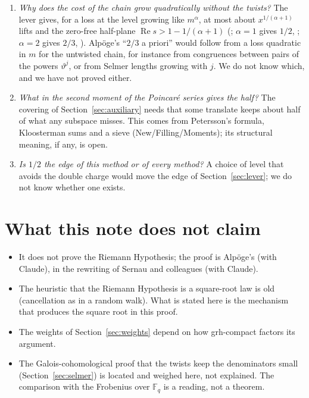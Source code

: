 \documentclass[11pt]{article}
\theoremstyle{definition}
\theoremstyle{remark}
\begin{document}
\begin{enumerate}
\item \emph{Why does the cost of the chain grow quadratically without the twists?} The lever
gives, for a loss at the level growing like $m^\alpha$, at most about $x^{1/(\alpha+1)}$ lifts and
the zero-free half-plane $\operatorname{Re}s>1-1/(\alpha+1)$ (;
$\alpha=1$ gives $1/2$, ; $\alpha=2$ gives $2/3$,
). Alpöge's ``$2/3$ a priori'' \cite[item 14]{Alpoge2026} would
follow from a loss quadratic in $m$ for the untwisted chain, for instance from congruences between
pairs of the powers $\vartheta^j$, or from Selmer lengths growing with $j$. We do not know which, and
we have not proved either.
\item \emph{What in the second moment of the Poincaré series gives the half?} The covering of
Section~\ref{sec:auxiliary} needs that some translate keeps about half of what any subspace misses.
This comes from Petersson's formula, Kloosterman sums and a sieve (New/Filling/Moments); its
structural meaning, if any, is open.
\item \emph{Is $1/2$ the edge of this method or of every method?} A choice of level that avoids
the double charge would move the edge of Section~\ref{sec:lever}; we do not know whether one exists.
\end{enumerate}

\section{What this note does not claim}

\begin{itemize}
\item It does not prove the Riemann Hypothesis; the proof is Alpöge's (with Claude), in the
rewriting of Sernau and colleagues (with Claude).
\item The heuristic that the Riemann Hypothesis is a square-root law is old (cancellation as in a
random walk). What is stated here is the mechanism that produces the square root in this proof.
\item The weights of Section~\ref{sec:weights} depend on how grh-compact factors its argument.
\item The Galois-cohomological proof that the twists keep the denominators small
(Section~\ref{sec:selmer}) is located and weighed here, not explained. The comparison with the
Frobenius over $\mathbb F_q$ is a reading, not a theorem.
\end{itemize}
\end{document}
